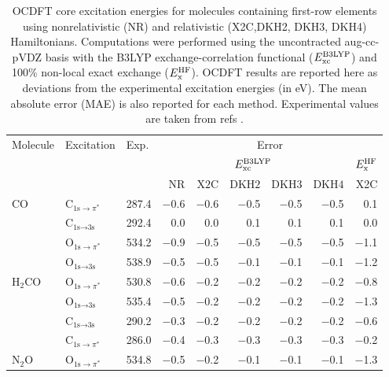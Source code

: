 \documentclass{article}
\begin{document}
\begin{table}[t!]
	\caption{OCDFT core excitation energies for molecules containing first-row elements using nonrelativistic (NR) and relativistic (X2C,DKH2, DKH3, DKH4) Hamiltonians. Computations were performed using the uncontracted aug-cc-pVDZ basis with the B3LYP exchange-correlation functional ($E^{\text{B3LYP}}_{\rm xc}$) and 100\% non-local exact exchange ($E^{\text{HF}}_{\rm x}$). OCDFT results are reported here as deviations from the experimental excitation energies (in eV).  The mean absolute error (MAE) is also reported for each method. Experimental values are taken from refs .}
\begin{tabular}{lllrrrrrr}
\toprule
Molecule & Excitation   & Exp.  & \multicolumn{6}{c}{Error} \\  \cmidrule(l){4-9}
&            &           &   \multicolumn{5}{c}{$E^{\text{B3LYP}}_{\rm xc}$} & $E^{\text{HF}}_{\rm x}$ \\ \cmidrule(l){4-8} 
&            &           &   NR &  ${\text{X2C}}$ & ${\text{DKH2}}$ & ${\text{DKH3}}$ & ${\text{DKH4}}$ & X2C \\
\midrule
CO 	 		& C$_{\text{1s}\rightarrow\pi^*}$ & 287.4 & $-$0.6 & $-$0.6 & $-$0.5 & $-$0.5 & $-$0.5 & 0.1 \\
			 & C$_{\text{1s}\rightarrow\text{3s}}$ & 292.4 & 0.0 & 0.0 & 0.1 & 0.1 & 0.1 & 0.0 \\
			 & O$_{\text{1s}\rightarrow\pi^*}$ & 534.2 & $-$0.9 & $-$0.5 & $-$0.5 & $-$0.5 & $-$0.5 & $-$1.1 \\
			 & O$_{\text{1s}\rightarrow\text{3s}}$ & 538.9 & $-$0.5 & $-$0.5 & $-$0.1 & $-$0.1 & $-$0.1 & $-$1.2 \\
H$_2$CO 	&  O$_{\text{1s}\rightarrow\pi^*}$ & 530.8 & $-$0.6 & $-$0.2 & $-$0.2 & $-$0.2 & $-$0.2 & $-$0.8 \\
		 & O$_{\text{1s}\rightarrow\text{3s}}$ & 535.4 & $-$0.5 & $-$0.2 & $-$0.2 & $-$0.2 & $-$0.2 & $-$1.3 \\
		& C$_{\text{1s}\rightarrow\text{3s}}$ & 290.2 & $-$0.3 & $-$0.2 & $-$0.2 & $-$0.2 & $-$0.2 & $-$0.6 \\
		 & C$_{\text{1s}\rightarrow\pi^*}$ & 286.0 & $-$0.4 & $-$0.3 & $-$0.3 & $-$0.3 & $-$0.3 & $-$0.2 \\
N$_2$O & O$_{\text{1s}\rightarrow\pi^*}$ & 534.8 & $-$0.5 & $-$0.2 & $-$0.1 & $-$0.1 & $-$0.1 & $-$1.3 \\

\end{tabular}
\end{table}
\end{document}
